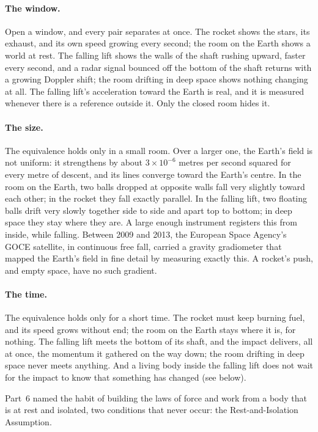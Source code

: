 \documentclass[11pt,a4paper]{article}
\begin{document}
\paragraph{The window.} Open a window, and every pair separates at once. The rocket shows the stars, its exhaust, and its own speed growing every second; the room on the Earth shows a world at rest. The falling lift shows the walls of the shaft rushing upward, faster every second, and a radar signal bounced off the bottom of the shaft returns with a growing Doppler shift; the room drifting in deep space shows nothing changing at all. The falling lift's acceleration toward the Earth is real, and it is measured whenever there is a reference outside it. Only the closed room hides it.

\paragraph{The size.} The equivalence holds only in a small room. Over a larger one, the Earth's field is not uniform: it strengthens by about $3\times10^{-6}$ metres per second squared for every metre of descent, and its lines converge toward the Earth's centre. In the room on the Earth, two balls dropped at opposite walls fall very slightly toward each other; in the rocket they fall exactly parallel. In the falling lift, two floating balls drift very slowly together side to side and apart top to bottom; in deep space they stay where they are. A large enough instrument registers this from inside, while falling. Between 2009 and 2013, the European Space Agency's GOCE satellite, in continuous free fall, carried a gravity gradiometer that mapped the Earth's field in fine detail by measuring exactly this. A rocket's push, and empty space, have no such gradient.

\paragraph{The time.} The equivalence holds only for a short time. The rocket must keep burning fuel, and its speed grows without end; the room on the Earth stays where it is, for nothing. The falling lift meets the bottom of its shaft, and the impact delivers, all at once, the momentum it gathered on the way down; the room drifting in deep space never meets anything. And a living body inside the falling lift does not wait for the impact to know that something has changed (see below).

 Part~6 named the habit of building the laws of force and work from a body that is at rest and isolated, two conditions that never occur: the Rest-and-Isolation Assumption. 
\end{document}
